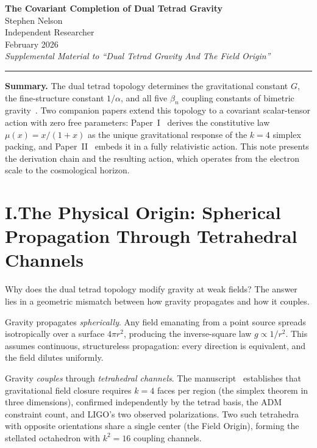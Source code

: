 \documentclass[11pt]{article}
\begin{document}
\begin{center}
{\Large\bfseries The Covariant Completion of Dual Tetrad Gravity}\\[12pt]
{\normalsize Stephen Nelson}\\
{\small Independent Researcher}\\[8pt]
{\small February 2026}\\[6pt]
{\small\itshape Supplemental Material to ``Dual Tetrad Gravity And The Field Origin''~\cite{nelson2026main}}
\end{center}

\vspace{0.5cm}
\hrule
\vspace{0.5cm}

\textbf{Summary.}\quad
The dual tetrad topology determines the gravitational constant $G$, the fine-structure constant $1/\alpha$, and all five $\beta_n$ coupling constants of bimetric gravity~\cite{nelson2026main}. Two companion papers extend this topology to a covariant scalar-tensor action with zero free parameters: Paper~I~\cite{paper1} derives the constitutive law $\mu(x) = x/(1+x)$ as the unique gravitational response of the $k = 4$ simplex packing, and Paper~II~\cite{paper2} embeds it in a fully relativistic action. This note presents the derivation chain and the resulting action, which operates from the electron scale to the cosmological horizon.

\section*{I.\quad The Physical Origin: Spherical Propagation Through Tetrahedral Channels}

Why does the dual tetrad topology modify gravity at weak fields? The answer lies in a geometric mismatch between how gravity propagates and how it couples.

Gravity propagates \emph{spherically}. Any field emanating from a point source spreads isotropically over a surface $4\pi r^2$, producing the inverse-square law $g \propto 1/r^2$. This assumes continuous, structureless propagation: every direction is equivalent, and the field dilutes uniformly.

Gravity \emph{couples} through \emph{tetrahedral channels}. The manuscript~\cite{nelson2026main} establishes that gravitational field closure requires $k = 4$ faces per region (the simplex theorem in three dimensions), confirmed independently by the tetrad basis, the ADM constraint count, and LIGO's two observed polarizations. Two such tetrahedra with opposite orientations share a single center (the Field Origin), forming the stellated octahedron with $k^2 = 16$ coupling channels.
\end{document}
